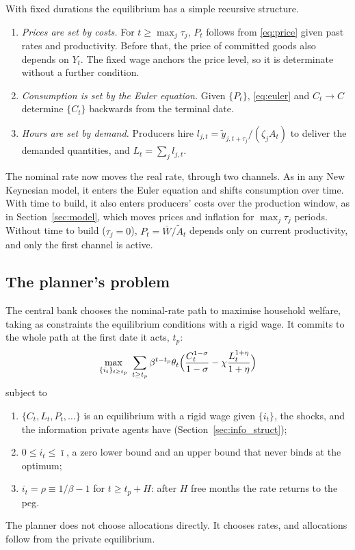 \documentclass[11pt]{article}
\theoremstyle{definition}
\begin{document}
\noindent With fixed durations the equilibrium has a simple recursive structure.
\begin{enumerate}
  \item \emph{Prices are set by costs.} For $t\ge\max_j\tau_j$, $P_t$ follows from \eqref{eq:price}
        given past rates and productivity. Before that, the price of committed goods also depends on
        $Y_t$. The fixed wage anchors the price level, so it is determinate without a further
        condition.
  \item \emph{Consumption is set by the Euler equation.} Given $\{P_t\}$, \eqref{eq:euler} and
        $C_t\to C$ determine $\{C_t\}$ backwards from the terminal date.
  \item \emph{Hours are set by demand.} Producers hire $l_{j,t}=\tilde y_{j,t+\tau_j}/(\zeta_jA_t)$ to
        deliver the demanded quantities, and $L_t=\sum_jl_{j,t}$.
\end{enumerate}
The nominal rate now moves the real rate, through two channels. As in any New Keynesian model, it
enters the Euler equation and shifts consumption over time. With time to build, it also enters
producers' costs over the production window, as in Section~\ref{sec:model}, which moves prices and
inflation for $\max_j\tau_j$ periods. Without time to build ($\tau_j=0$), $P_t=\bar W/\tilde A_t$
depends only on current productivity, and only the first channel is active.

\subsection{The planner's problem}\label{sec:ramsey}

The central bank chooses the nominal-rate path to maximise household welfare, taking as constraints
the equilibrium conditions with a rigid wage. It commits to the whole path at the first date it acts,
$t_p$:
\begin{equation}\label{eq:ramsey}
  \max_{\{i_t\}_{t\ge t_p}}\;\sum_{t\ge t_p}\beta^{t-t_p}\theta_t
     \Bigl(\frac{C_t^{1-\sigma}}{1-\sigma}-\chi\frac{L_t^{1+\eta}}{1+\eta}\Bigr)
\end{equation}
subject to
\begin{enumerate}
  \item $\{C_t,L_t,P_t,\dots\}$ is an equilibrium with a rigid wage given $\{i_t\}$, the shocks, and the
        information private agents have (Section~\ref{sec:info_struct});
  \item $0\le i_t\le\bar\imath$, a zero lower bound and an upper bound that never binds at the optimum;
  \item $i_t=\rho\equiv1/\beta-1$ for $t\ge t_p+H$: after $H$ free months the rate returns to the peg.
\end{enumerate}
The planner does not choose allocations directly. It chooses rates, and allocations follow from
the private equilibrium.
\end{document}
